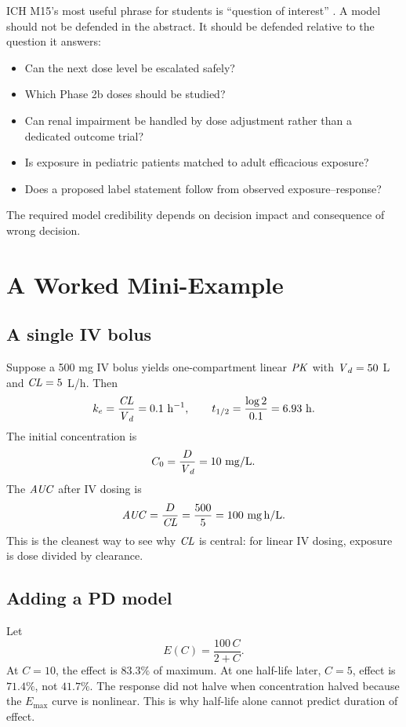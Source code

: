 \documentclass[a4paper]{article}
\renewcommand{\Emax}{\ensuremath{E_{\max}}}
\newcommand{\CL}{\ensuremath{\pksym{CL}}}
\newcommand{\Vd}{\ensuremath{\pksym{V}_d}}
\newcommand{\AUC}{\ensuremath{\pksym{AUC}}}
\newcommand{\ke}{\ensuremath{k_e}}
\newcommand{\PK}{\ensuremath{\pksym{PK}}}
\begin{document}
ICH M15's most useful phrase for students is ``question of interest'' \cite{ichM15Midd2026}. A model should not be defended in the abstract. It should be defended relative to the question it answers:
\begin{itemize}[leftmargin=2em]
  \item Can the next dose level be escalated safely?
  \item Which Phase 2b doses should be studied?
  \item Can renal impairment be handled by dose adjustment rather than a dedicated outcome trial?
  \item Is exposure in pediatric patients matched to adult efficacious exposure?
  \item Does a proposed label statement follow from observed exposure--response?
\end{itemize}
The required model credibility depends on decision impact and consequence of wrong decision.

\section{A Worked Mini-Example}

\subsection{A single IV bolus}

Suppose a 500 mg IV bolus yields one-compartment linear \PK{} with \(\Vd=50\) L and \(\CL=5\) L/h. Then
\[
  \ke=\frac{\CL}{\Vd}=0.1\ \pklab{h}^{-1},
  \qquad
  t_{1/2}=\frac{\log 2}{0.1}=6.93\ \pklab{h}.
\]
The initial concentration is
\[
  C_0=\frac{D}{\Vd}=10\ \pklab{mg/L}.
\]
The \(\AUC\) after IV dosing is
\[
  \AUC=\frac{D}{\CL}=\frac{500}{5}=100\ \pklab{mg\,h/L}.
\]
This is the cleanest way to see why \CL{} is central: for linear IV dosing, exposure is dose divided by clearance.

\subsection{Adding a PD model}

Let
\[
  E(C)=\frac{100\,C}{2+C}.
\]
At \(C=10\), the effect is \(83.3\%\) of maximum. At one half-life later, \(C=5\), effect is \(71.4\%\), not \(41.7\%\). The response did not halve when concentration halved because the \(\Emax\) curve is nonlinear. This is why half-life alone cannot predict duration of effect.
\end{document}
